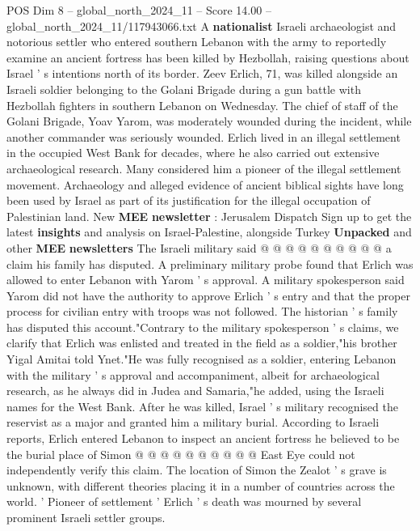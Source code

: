 \begin{textsample}{POS Dim 8 – global\_north\_2024\_11 – Score 14.00 – global\_north\_2024\_11/117943066.txt}  \label{ex:f8_pos_053}
A \textbf{nationalist} Israeli archaeologist and notorious settler who entered southern Lebanon with the army to reportedly examine an ancient fortress has been killed by Hezbollah, raising questions about Israel ' s intentions north of its border.
Zeev Erlich, 71, was killed alongside an Israeli soldier belonging to the Golani Brigade during a gun battle with Hezbollah fighters in southern Lebanon on Wednesday.
The chief of staff of the Golani Brigade, Yoav Yarom, was moderately wounded during the incident, while another commander was seriously wounded.
Erlich lived in an illegal settlement in the occupied West Bank for decades, where he also carried out extensive archaeological research.
Many considered him a pioneer of the illegal settlement movement.
Archaeology and alleged evidence of ancient biblical sights have long been used by Israel as part of its justification for the illegal occupation of Palestinian land.
New \textbf{MEE} \textbf{newsletter} : Jerusalem Dispatch Sign up to get the latest \textbf{insights} and analysis on Israel-Palestine, alongside Turkey \textbf{Unpacked} and other \textbf{MEE} \textbf{newsletters} The Israeli military said @ @ @ @ @ @ @ @ @ @ a claim his family has disputed.
A preliminary military probe found that Erlich was allowed to enter Lebanon with Yarom ' s approval.
A military spokesperson said Yarom did not have the authority to approve Erlich ' s entry and that the proper process for civilian entry with troops was not followed.
The historian ' s family has disputed this account."Contrary to the military spokesperson ' s claims, we clarify that Erlich was enlisted and treated in the field as a soldier,"his brother Yigal Amitai told Ynet."He was fully recognised as a soldier, entering Lebanon with the military ' s approval and accompaniment, albeit for archaeological research, as he always did in Judea and Samaria,"he added, using the Israeli names for the West Bank.
After he was killed, Israel ' s military recognised the reservist as a major and granted him a military burial.
According to Israeli reports, Erlich entered Lebanon to inspect an ancient fortress he believed to be the burial place of Simon @ @ @ @ @ @ @ @ @ @ East Eye could not independently verify this claim.
The location of Simon the Zealot ' s grave is unknown, with different theories placing it in a number of countries across the world. ' Pioneer of settlement ' Erlich ' s death was mourned by several prominent Israeli settler groups.

\end{textsample}
